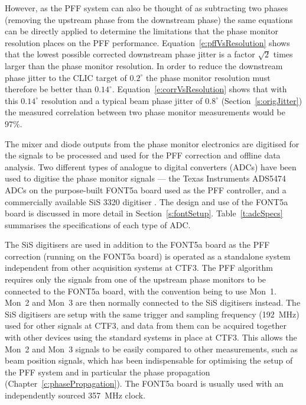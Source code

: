 However, as the PFF system can also be thought of as subtracting two phases (removing the upstream phase from the downstream phase) the same equations can be directly applied to determine the limitations that the phase monitor resolution places on the PFF performance. Equation~\ref{e:pffVsResolution} shows that the lowest possible corrected downstream phase jitter is a factor \(\sqrt{2}\) times larger than the phase monitor resolution. In order to reduce the downstream phase jitter to the CLIC target of \(0.2^\circ\) the phase monitor resolution must therefore be better than \(0.14^\circ\). Equation~\ref{e:corrVsResolution} shows that with this \(0.14^\circ\) resolution and a typical beam phase jitter of \(0.8^\circ\) (Section~\ref{s:origJitter}) the measured correlation between two phase monitor measurements would be \(97\%\).


The mixer and diode outputs from the phase monitor electronics are digitised for the signals to be processed and used for the PFF correction and offline data analysis. Two different types of analogue to digital converters (ADCs) have been used to digitise the phase monitor signals --- the Texas Instruments ADS5474 ADCs \cite{fontADCs} on the purpose-built FONT5a board used as the PFF controller, and a commercially available SiS 3320 digitiser \cite{sisDigi}. The design and use of the FONT5a board is discussed in more detail in Section~\ref{s:fontSetup}. Table~\ref{t:adcSpecs} summarises the specifications of each type of ADC. 

The SiS digitisers are used in addition to the FONT5a board as the PFF correction (running on the FONT5a board) is operated as a standalone system independent from other acquisition systems at CTF3. The PFF algorithm requires only the signals from one of the upstream phase monitors to be connected to the FONT5a board, with the convention being to use Mon~1. Mon~2 and Mon~3 are then normally connected to the SiS digitisers instead. The SiS digitisers are setup with the same trigger and sampling frequency (192~MHz) used for other signals at CTF3, and data from them can be acquired together with other devices using the standard systems in place at CTF3. This allows the Mon~2 and Mon~3 signals to be easily compared to other measurements, such as beam position signals, which has been indispensable for optimising the setup of the PFF system and in particular the phase propagation (Chapter~\ref{c:phasePropagation}). The FONT5a board is usually used with an independently sourced 357~MHz clock.

